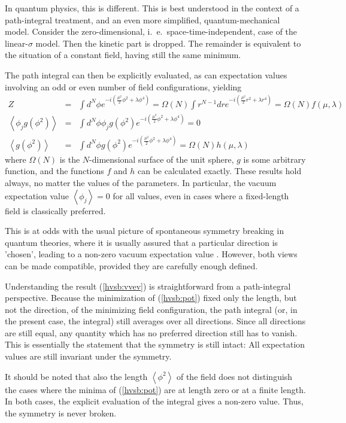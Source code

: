 \documentclass[final,12pt,3p,longtitle]{elsarticle}
\newcommand*{\no}{\noindent}
\newcommand*{\bea}{\begin{eqnarray}}
\newcommand*{\eea}{\end{eqnarray}}
\newcommand*{\pref}[1]{(\ref{#1})}
\newcommand*{\nn}{\nonumber}
\newcommand*{\1}{1\!\!\!\bot}
\newcommand*{\la}{\left\langle}
\newcommand*{\ra}{\right\rangle}
\begin{document}
In quantum physics, this is different. This is best understood in the context of a path-integral treatment, and an even more simplified, quantum-mechanical model. Consider the zero-dimensional, i.\ e.\ space-time-independent, case of the linear-$\sigma$ model. Then the kinetic part is dropped. The remainder is equivalent to the situation of a constant field, having still the same minimum.

The path integral can then be explicitly evaluated, as can expectation values involving an odd or even number of field configurations, yielding
\bea
Z&=&\int d^N\phi e^{-i\left(\frac{\mu^2}{2}\phi^2+\lambda\phi^4\right)}=\Omega(N)\int r^{N-1}dr e^{-i\left(\frac{\mu^2}{2}r^2+\lambda r^4\right)}=\Omega(N)f(\mu,\lambda)\nn\\
\la\phi_j g(\phi^2)\ra&=&\int d^N\phi \phi_j g(\phi^2) e^{-i\left(\frac{\mu^2}{2}\phi^2+\lambda\phi^4\right)}=0\label{hvsb:vvev}\\
\la g(\phi^2)\ra&=&\int d^N\phi g(\phi^2) e^{-i\left(\frac{\mu^2}{2}\phi^2+\lambda\phi^4\right)}=\Omega(N)h(\mu,\lambda)\nn
\eea
\no where $\Omega(N)$ is the $N$-dimensional surface of the unit sphere, $g$ is some arbitrary function, and the functions $f$ and $h$ can be calculated exactly. These results hold always, no matter the values of the parameters. In particular, the vacuum expectation value $\la\phi_j\ra=0$ for all values, even in cases where a fixed-length field is classically preferred.

This is at odds with the usual picture of spontaneous symmetry breaking in quantum theories, where it is usually assured that a particular direction is 'chosen', leading to a non-zero vacuum expectation value \cite{Bohm:2001yx}. However, both views can be made compatible, provided they are carefully enough defined.

Understanding the result \pref{hvsb:vvev} is straightforward from a path-integral perspective. Because the minimization of \pref{hvsb:pot} fixed only the length, but not the direction, of the minimizing field configuration, the path integral (or, in the present case, the integral) still averages over all directions. Since all directions are still equal, any quantity which has no preferred direction still has to vanish. This is essentially the statement that the symmetry is still intact: All expectation values are still invariant under the symmetry.

It should be noted that also the length $\la\phi^2\ra$ of the field does not distinguish the cases where the minima of \pref{hvsb:pot} are at length zero or at a finite length. In both cases, the explicit evaluation of the integral gives a non-zero value. Thus, the symmetry is never broken.
\end{document}
